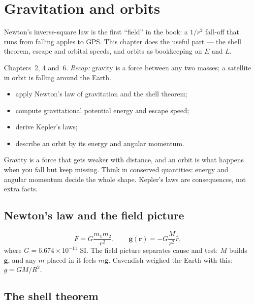 \chapter{Gravitation and orbits}\label{ch:grav}

Newton's inverse-square law is the first ``field'' in the book: a
$1/r^{2}$ fall-off that runs from falling apples to GPS. This chapter
does the useful part --- the shell theorem, escape and orbital speeds,
and orbits as bookkeeping on $E$ and $L$.

\begin{rulebox}
Chapters~2, 4 and~6. \emph{Recap:} gravity is a force between any two masses; a satellite in orbit is falling around the Earth.
\end{rulebox}
\begin{wins}
\begin{itemize}
\item apply Newton's law of gravitation and the shell theorem;
\item compute gravitational potential energy and escape speed;
\item derive Kepler's laws;
\item describe an orbit by its energy and angular momentum.
\end{itemize}
\end{wins}
\begin{principle}
Gravity is a force that gets weaker with distance, and an orbit is what happens when you fall but keep missing. Think in conserved quantities: energy and angular momentum decide the whole shape. Kepler's laws are consequences, not extra facts.
\end{principle}

\section{Newton's law and the field picture}\label{sec:grav-law}

\begin{equation}
  F=G\frac{m_1m_2}{r^{2}},\qquad
  \mathbf g(\mathbf r)=-G\frac{M}{r^{2}}\hat r,\label{eq:grav}
\end{equation}
where $G=6.674\times10^{-11}$ SI. The field picture separates cause and
test: $M$ builds $\mathbf g$, and any $m$ placed in it feels
$m\mathbf g$. Cavendish weighed the Earth with this: $g=GM/R^{2}$.

\section{The shell theorem}\label{sec:grav-shell}

